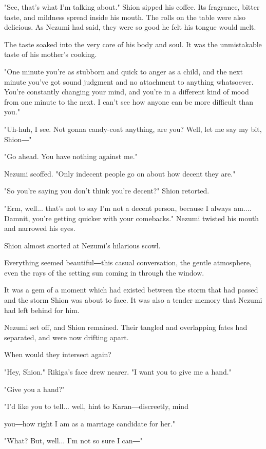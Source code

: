 "See, that's what I'm talking about." Shion sipped his coffee. Its
fragrance, bitter taste, and mildness spread inside his mouth. The rolls
on the table were also delicious. As Nezumi had said, they were so good
he felt his tongue would melt.

The taste soaked into the very core of his body and soul. It was the
unmistakable taste of his mother's cooking.

"One minute you're as stubborn and quick to anger as a child, and the
next minute you've got sound judgment and no attachment to anything
whatsoever. You're constantly changing your mind, and you're in a
different kind of mood from one minute to the next. I can't see how
anyone can be more difficult than you."

"Uh-huh, I see. Not gonna candy-coat anything, are you? Well, let me say
my bit, Shion―"

"Go ahead. You have nothing against me."

Nezumi scoffed. "Only indecent people go on about how decent they are."

"So you're saying you don't think you're decent?" Shion retorted.

"Erm, well... that's not to say I'm not a decent person, because I
always am.... Damnit, you're getting quicker with your comebacks."
Nezumi twisted his mouth and narrowed his eyes.

Shion almost snorted at Nezumi's hilarious scowl.

Everything seemed beautiful―this casual conversation, the gentle
atmosphere, even the rays of the setting sun coming in through the
window.

It was a gem of a moment which had existed between the storm that had
passed and the storm Shion was about to face. It was also a tender
memory that Nezumi had left behind for him.

\myspace

Nezumi set off, and Shion remained. Their tangled and overlapping fates
had separated, and were now drifting apart.

When would they intersect again?

"Hey, Shion." Rikiga's face drew nearer. "I want you to give me a hand."

"Give you a hand?"

"I'd like you to tell... well, hint to Karan―discreetly, mind~

you―how right I am as a marriage candidate for her."

"What? But, well... I'm not so sure I can―"

